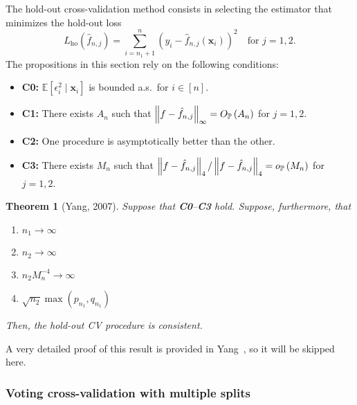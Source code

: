 \documentclass[12pt, letter paper]{article}
\newcommand{\1}{\mathmybb{1}}
\newtheorem{theorem}[proposition]{Theorem}
\newcommand{\0}{\emptyset}
\newcommand{\prob}{\mathbb{P}}
\newcommand{\Ep}[1]{\mathbb{E}\left[ #1 \right]}
\newcommand{\paren}[1]{\left(#1 \right)}
\newcommand{\norm}[1]{\left|\hspace{-1pt}\left|#1 \right|\hspace{-1pt}\right|}
\newcommand{\x}{\boldsymbol{x}}
\newcommand{\op}[1]{o_{\prob}\paren{#1}}
\newcommand{\Op}[1]{O_{\prob}\paren{#1}}
\newcommand{\fhat}[2]{\hat{f}_{#1, #2}}
\begin{document}
The hold-out cross-validation method consists in selecting the estimator that minimizes the hold-out loss
\[L_{\mathrm{ho}}(\fhat{n}{j}) = \sum_{i=n_{1}+1}^{n}\paren{y_{i} - \fhat{n}{j}(\x_{i})}^{2}\quad\text{for }j=1,2.\]
The propositions in this section rely on the following conditions:
\begin{itemize}
    \item \textbf{C0:} \(\Ep{\epsilon_{i}^{2}\mid \x_{i}}\) is bounded a.s.\ for \(i\in[n]\).
    \item \textbf{C1:} There exists \(A_{n}\) such that \(\norm{f-\fhat{n}{j}}_{\infty} = \Op{A_{n}}\) for \(j=1,2\).
    \item \textbf{C2:} One procedure is asymptotically better than the other.
    \item \textbf{C3:} There exists \(M_{n}\) such that \(\norm{f-\fhat{n}{j}}_{4} / \norm{f-\fhat{n}{j}}_{4} = \op{M_{n}}\) for \(j=1,2\).
\end{itemize}

\begin{theorem}[Yang, 2007]\label{prop:yangth1}
    Suppose that \textbf{C0}--\textbf{C3} hold. Suppose, furthermore, that
    \begin{enumerate}
        \item \(n_{1}\to\infty\)
        \item \(n_{2}\to\infty\)
        \item \(n_{2}M_{n}^{-4} \to \infty\)
        \item \(\sqrt{n_{2}}\max(p_{n_{1}}, q_{n_{1}})\)
    \end{enumerate}
    Then, the hold-out CV procedure is consistent.
\end{theorem}

A very detailed proof of this result is provided in Yang~\cite{yang_2007}, so it will be skipped here.

\subsubsection{Voting cross-validation with multiple splits}
\end{document}
